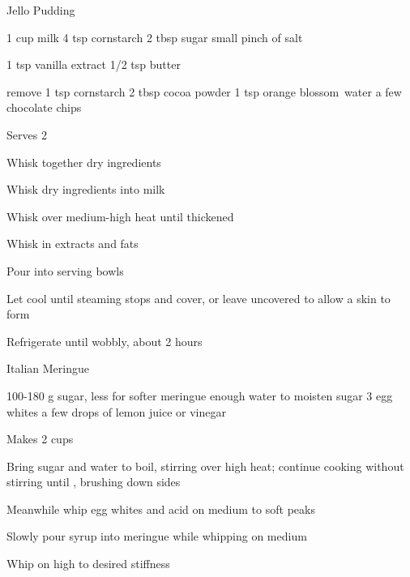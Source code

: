 \begin{denserecipe}{Jello Pudding}{\vegetarian{}}
\begin{ingredients}
1 cup milk
4 tsp cornstarch
2 tbsp sugar
small pinch of salt

1 tsp vanilla extract
1/2 tsp butter

remove 1 tsp cornstarch
2 tbsp cocoa powder
1 tsp orange \mbox{blossom water}
a few chocolate chips
\end{ingredients}
\nextcolumn
Serves 2
\begin{steps}
    \item Whisk together dry ingredients
    \item Whisk dry ingredients into milk
    \item Whisk over medium-high heat until thickened
    \item Whisk in extracts and fats
    \item Pour into serving bowls
    \item Let cool until steaming stops and cover, or leave uncovered to allow a skin to form
    \item Refrigerate until wobbly, about 2 hours
\end{steps}
\end{denserecipe}

\begin{recipe}{Italian Meringue}{\vegetarian{}}
\begin{ingredients}
100-180 g sugar, less for softer meringue
enough water to moisten sugar
3 egg whites
a few drops of lemon juice or vinegar
\end{ingredients}
\nextcolumn
Makes 2 cups
\begin{steps}
    \item Bring sugar and water to boil, stirring over high heat; continue cooking without stirring until , brushing down sides
    \item Meanwhile whip egg whites and acid on medium to soft peaks
    \item Slowly pour syrup into meringue while whipping on medium
    \item Whip on high to desired stiffness
\end{steps}
\end{recipe}

